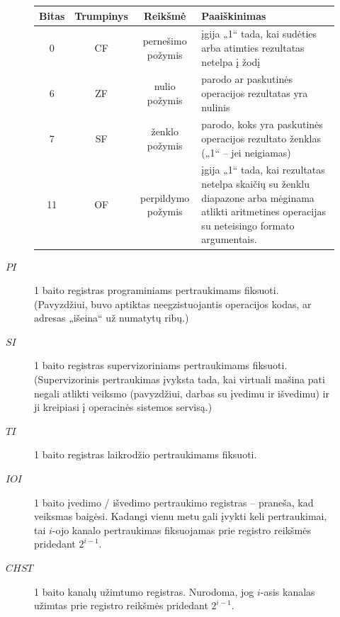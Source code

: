 \begin{description}
\begin{description}
        \begin{tabularx}{0.85\textwidth}{|c|c|c|X|}
          \hline
          Bitas & Trumpinys & Reikšmė & Paaiškinimas %
          \\
          \hline
          0 & CF & pernešimo požymis & įgija „1“ tada, kai sudėties arba
          atimties rezultatas netelpa į žodį 
          \\
          \hline
          6 & ZF & nulio požymis & parodo ar paskutinės operacijos 
          rezultatas yra nulinis %
          \\
          \hline
          7 & SF & ženklo požymis & parodo, koks yra paskutinės operacijos 
          rezultato ženklas („1“ – jei neigiamas) 
          \\
          \hline
          11 & OF & perpildymo požymis & įgija „1“ tada, kai rezultatas
          netelpa skaičių su ženklu diapazone arba mėginama atlikti 
          aritmetines operacijas su neteisingo formato argumentais.
          \\
          \hline
        \end{tabularx}
      \item[$PI$] 1 baito registras programiniams pertraukimams fiksuoti.
        (Pavyzdžiui, buvo aptiktas neegzistuojantis operacijos kodas, ar
        adresas „išeina“ už numatytų ribų.)
      \item[$SI$] 1 baito registras supervizoriniams pertraukimams fiksuoti.
        (Supervizorinis pertraukimas įvyksta tada, kai virtuali mašina
        pati negali atlikti veiksmo (pavyzdžiui, darbas su įvedimu ir
        išvedimu) ir ji kreipiasi į operacinės sistemos servisą.)
      \item[$TI$] 1 baito registras laikrodžio pertraukimams fiksuoti.
      \item[$IOI$] 1 baito įvedimo / išvedimo pertraukimo registras – 
        praneša, kad veiksmas baigėsi. Kadangi vienu 
        metu gali įvykti keli pertraukimai, tai $i$-ojo kanalo pertraukimas
        fiksuojamas prie registro reikšmės pridedant $2^{i-1}$.
      \item[$CHST$] 1 baito kanalų užimtumo registras. Nurodoma, jog
        $i$-asis kanalas užimtas prie registro reikšmės pridedant 
        $2^{i-1}$.
    \end{description}


\end{description}
